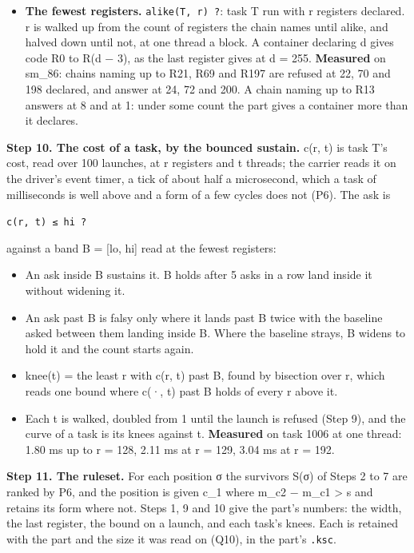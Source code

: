 \begin{itemize}
\item \textbf{The fewest registers.} \texttt{alike(T, r) ?}: task T run with r registers declared. r is walked up from the count of registers the chain names until alike, and halved down until not, at one thread a block. A container declaring d gives code R0 to R(d − 3), as the last register gives at d = 255. \textbf{Measured} on sm\_\allowbreak{}86: chains naming up to R21, R69 and R197 are refused at 22, 70 and 198 declared, and answer at 24, 72 and 200. A chain naming up to R13 answers at 8 and at 1: under some count the part gives a container more than it declares.
\end{itemize}

\textbf{Step 10. The cost of a task, by the bounced sustain.} c(r, t) is task T's cost, read over 100 launches, at r registers and t threads; the carrier reads it on the driver's event timer, a tick of about half a microsecond, which a task of milliseconds is well above and a form of a few cycles does not (P6). The ask is

\texttt{c(r, t) ≤ hi ?}

against a band B = [lo, hi] read at the fewest registers:

\begin{itemize}
\item An ask inside B sustains it. B holds after 5 asks in a row land inside it without widening it.
\item An ask past B is falsy only where it lands past B twice with the baseline asked between them landing inside B. Where the baseline strays, B widens to hold it and the count starts again.
\item knee(t) = the least r with c(r, t) past B, found by bisection over r, which reads one bound where c(·, t) past B holds of every r above it.
\item Each t is walked, doubled from 1 until the launch is refused (Step 9), and the curve of a task is its knees against t. \textbf{Measured} on task 1006 at one thread: 1.80 ms up to r = 128, 2.11 ms at r = 129, 3.04 ms at r = 192.
\end{itemize}

\textbf{Step 11. The ruleset.} For each position σ the survivors S(σ) of Steps 2 to 7 are ranked by P6, and the position is given c\_\allowbreak{}1 where m\_\allowbreak{}c2 − m\_\allowbreak{}c1 > s and retains its form where not. Steps 1, 9 and 10 give the part's numbers: the width, the last register, the bound on a launch, and each task's knees. Each is retained with the part and the size it was read on (Q10), in the part's \texttt{.\allowbreak{}ksc}.

